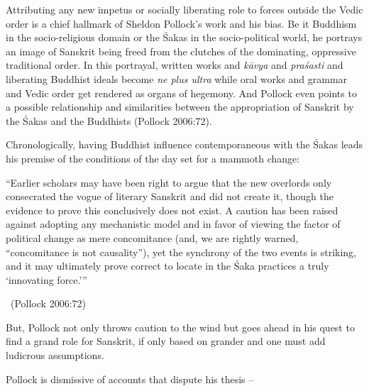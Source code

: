 Attributing any new impetus or socially liberating role to forces outside the Vedic order is a chief hallmark of Sheldon Pollock’s work and his bias. Be it Buddhism in the socio-religious domain or the Śakas in the socio-political world, he portrays an image of Sanskrit being freed from the clutches of the dominating, oppressive traditional order. In this portrayal, written works and \textit{kāvya} and \textit{praśasti} and liberating Buddhist ideals become \textit{ne plus ultra} while oral works and grammar and Vedic order get rendered as organs of hegemony. And Pollock even points to a possible relationship and similarities between the appropriation of Sanskrit by the Śakas and the Buddhists (Pollock 2006:72).

Chronologically, having Buddhist influence contemporaneous with the Śakas leads his premise of the conditions of the day set for a mammoth change:

\begin{myquote}
“Earlier scholars may have been right to argue that the new overlords only consecrated the vogue of literary Sanskrit and did not create it, though the evidence to prove this conclusively does not exist. A caution has been raised against adopting any mechanistic model and in favor of viewing the factor of political change as mere concomitance (and, we are rightly warned, “concomitance is not causality”), yet the synchrony of the two events is striking, and it may ultimately prove correct to locate in the Śaka practices a truly ‘innovating force.’” 

~\hfill (Pollock 2006:72)
\end{myquote}

But, Pollock not only throws caution to the wind but goes ahead in his quest to find a grand role for Sanskrit, if only based on grander and one must add ludicrous assumptions.

Pollock is dismissive of accounts that dispute his thesis –

